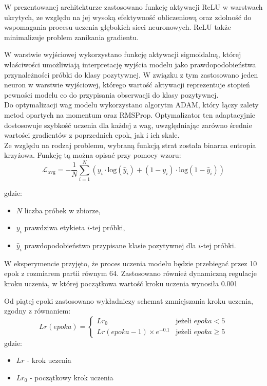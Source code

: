 \documentclass[a4paper,twoside,12pt]{book}
\begin{document}
W prezentowanej architekturze zastosowano funkcję aktywacji ReLU w warstwach ukrytych, ze względu na jej wysoką efektywność obliczeniową oraz zdolność do wspomagania procesu uczenia głębokich sieci neuronowych. ReLU także minimalizuje problem zanikania gradientu.

W warstwie wyjściowej wykorzystano funkcję aktywacji sigmoidalną, której właściwości umożliwiają interpretację wyjścia modelu jako prawdopodobieństwa przynależności próbki do klasy pozytywnej. W związku z tym zastosowano jeden neuron w warstwie wyjściowej, którego wartość aktywacji reprezentuje stopień pewności modelu co do przypisania obserwacji do klasy pozytywnej.\\

Do optymalizacji wag modelu wykorzystano algorytm ADAM, który łączy zalety metod opartych na momentum oraz RMSProp. Optymalizator ten adaptacyjnie dostosowuje szybkość uczenia dla każdej z wag, uwzględniając zarówno średnie wartości gradientów z poprzednich epok, jak i ich skale\cite{kingma2014adam,ruder2016overview}.\\

Ze względu na rodzaj problemu, wybraną funkcją strat została binarna entropia krzyżowa. Funkcję tą można opisać przy pomocy wzoru:
\begin{equation}
	\mathcal{L}_{\text{avg}} = - \frac{1}{N} \sum_{i=1}^{N} \left( y_i \cdot \mathrm{log}(\hat{y}_i) + (1 - y_i) \cdot \mathrm{log}(1 - \hat{y}_i) \right)
\end{equation}

gdzie:
\begin{itemize}
	\item $N$  liczba próbek w zbiorze,
	\item $y_i$  prawdziwa etykieta $i$-tej próbki,
	\item $\hat{y}_i$  prawdopodobieństwo przypisane klasie pozytywnej dla $i$-tej próbki.
\end{itemize}
W eksperymencie przyjęto, że proces uczenia modelu będzie przebiegać przez 10 epok z rozmiarem partii równym 64. Zastosowano również dynamiczną regulacje kroku uczenia, w której początkowa wartość kroku uczenia wynosiła 0.001

Od piątej epoki zastosowano wykładniczy schemat zmniejszania kroku uczenia, zgodny z równaniem:	{
\begin{equation}
	Lr(epoka) =
	\begin{cases}
		Lr_0                          & \text{jeżeli } epoka < 5    \\
		Lr(epoka - 1) \times e^{-0.1} & \text{jeżeli } epoka \geq 5
	\end{cases}
\end{equation}
}
gdzie:
\begin{itemize}
	\item $Lr$ - krok uczenia
	\item $Lr_0$ - początkowy krok uczenia
\end{itemize}
\end{document}
